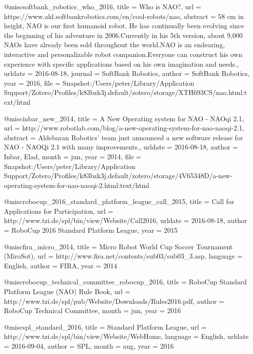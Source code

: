{{@misc{softbank_robotics_who_2016,
  title    = {Who is {NAO}?},
  url      = {https://www.ald.softbankrobotics.com/en/cool-robots/nao},
  abstract = {58 cm in height, NAO is our first humanoid robot. He has continually been evolving since the beginning of his adventure in 2006.Currently in his 5th version, about 9,000 NAOs have already been sold throughout the world.NAO is an endearing, interactive and personalizable robot companion.Everyone can construct his own experience with specific applications based on his own imagination and needs.},
  urldate  = {2016-08-18},
  journal  = {SoftBank Robotics},
  author   = {SoftBank Robotics},
  year     = {2016},
  file     = {Snapshot:/Users/peter/Library/Application Support/Zotero/Profiles/k83bzk3j.default/zotero/storage/XTH693CS/nao.html:text/html}
}

@misc{inbar_new_2014,
  title    = {A {New} {Operating} system for {NAO} - {NAOqi} 2.1},
  url      = {http://www.robotlab.com/blog/a-new-operating-system-for-nao-naoqi-2.1},
  abstract = {Aldebaran Robotics' team just announced a new software release for NAO - NAOQi 2.1 with many improvements.},
  urldate  = {2016-08-18},
  author   = {Inbar, Elad},
  month    = jun,
  year     = {2014},
  file     = {Snapshot:/Users/peter/Library/Application Support/Zotero/Profiles/k83bzk3j.default/zotero/storage/4V65348D/a-new-operating-system-for-nao-naoqi-2.html:text/html}
}

@misc{robocup_2016_standard_platform_league_call_2015,
  title   = {Call for {Applications} for {Participation}},
  url     = {http://www.tzi.de/spl/bin/view/Website/Call2016},
  urldate = {2016-08-18},
  author  = {RoboCup 2016 Standard Platform League},
  year    = {2015}
}

@misc{fira_micro_2014,
  title    = {Micro {Robot} {World} {Cup} {Soccer} {Tournament} ({MiroSot})},
  url      = {http://www.fira.net/contents/sub03/sub03_3.asp},
  language = {English},
  author   = {FIRA},
  year     = {2014}
}

@misc{robocup_technical_committee_robocup_2016,
  title  = {{RoboCup} {Standard} {Platform} {League} ({NAO}) {Rule} {Book}},
  url    = {http://www.tzi.de/spl/pub/Website/Downloads/Rules2016.pdf},
  author = {RoboCup Technical Committee},
  month  = jun,
  year   = {2016}
}

@misc{spl_standard_2016,
  title    = {Standard {Platform} {League}},
  url      = {http://www.tzi.de/spl/bin/view/Website/WebHome},
  language = {English},
  urldate  = {2016-09-04},
  author   = {SPL},
  month    = aug,
  year     = {2016}
}

}}
